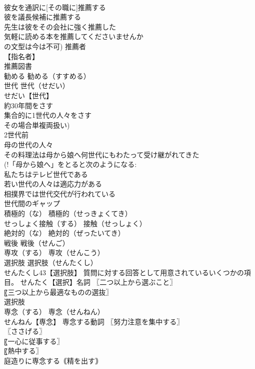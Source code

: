 \documentclass[8pt]{extreport}
\begin{document}
\begin{CJK}{UTF8}{min}
\\	彼女を通訳に[その職に]推薦する 
\\	彼を議長候補に推薦する 
\\	先生は彼をその会社に強く推薦した 
\\	気軽に読める本を推薦してくださいませんか 
\\	の文型は今は不可) 推薦者 
\\	【指名者】
\\	推薦図書 
\\	勧める		勧める（すすめる） 
\\	世代		世代（せだい） 
\\	せだい【世代】 
\\	約30年間をさす
\\	集合的に1世代の人々をさす
\\	その場合単複両扱い) 
\\	2世代前 
\\	母の世代の人々 
\\	その料理法は母から娘へ何世代にもわたって受け継がれてきた 
\\	(!「母から娘へ」をとると次のようになる: 
\\	私たちはテレビ世代である 
\\	若い世代の人々は適応力がある 
\\	相撲界では世代交代が行われている 
\\	世代間のギャップ 
\\	積極的（な）		積極的（せっきょくてき） 
\\	せっしょく接触（する）		接触（せっしょく） 
\\	絶対的（な）		絶対的（ぜったいてき） 
\\	戦後		戦後（せんご） 
\\	専攻（する）		専攻（せんこう） 
\\	選択肢		選択肢（せんたくし） 
\\	せんたくし43【選択肢】 質問に対する回答として用意されているいくつかの項目。 せんたく【選択】名詞 〖二つ以上から選ぶこと〗
\\	〖三つ以上から最適なものの選抜〗
\\	選択肢 
\\	専念（する）		専念（せんねん） 
\\	せんねん【専念】 専念する動詞 〖努力注意を集中する〗
\\	〖ささげる〗
\\	〖一心に従事する〗
\\	〖熱中する〗
\\	庭造りに専念する｟精を出す｠ 

\end{CJK}
\end{document}

